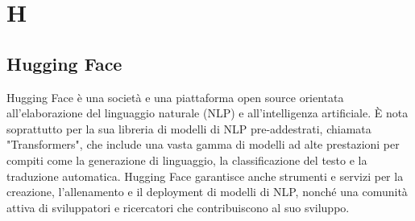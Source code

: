 \section{H}

\vspace{2em}
\subsection*{Hugging Face}
\par Hugging Face è una società e una piattaforma open source orientata all'elaborazione del linguaggio naturale (NLP) e all'intelligenza artificiale. È nota soprattutto per la sua libreria di modelli di NLP pre-addestrati, chiamata "Transformers", che include una vasta gamma di modelli ad alte prestazioni per compiti come la generazione di linguaggio, la classificazione del testo e la traduzione automatica. Hugging Face garantisce anche strumenti e servizi per la creazione, l'allenamento e il deployment di modelli di NLP, nonché una comunità attiva di sviluppatori e ricercatori che contribuiscono al suo sviluppo.
